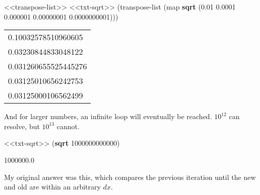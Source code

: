 \documentclass[
]{article}
\newenvironment{Shaded}{}{}
\newcommand{\DecValTok}[1]{\textcolor[rgb]{0.25,0.63,0.44}{#1}}
\newcommand{\FloatTok}[1]{\textcolor[rgb]{0.25,0.63,0.44}{#1}}
\newcommand{\KeywordTok}[1]{\textcolor[rgb]{0.00,0.44,0.13}{\textbf{#1}}}
\newcommand{\NormalTok}[1]{#1}
\begin{document}
\hypertarget{EX1-7-t1}{%
\label{EX1-7-t1}}%
\begin{Shaded}
\begin{Highlighting}[]
\NormalTok{\textless{}\textless{}transpose{-}list\textgreater{}\textgreater{}}
\NormalTok{\textless{}\textless{}txt{-}sqrt\textgreater{}\textgreater{}}
\NormalTok{(transpose{-}list (map }\KeywordTok{sqrt}\NormalTok{ \textquotesingle{}(}\FloatTok{0.01} \FloatTok{0.0001} \FloatTok{0.000001} \FloatTok{0.00000001} \FloatTok{0.0000000001}\NormalTok{)))}
\end{Highlighting}
\end{Shaded}

\begin{longtable}[]{@{}l@{}}
\toprule
\endhead
0.10032578510960605 \\
0.03230844833048122 \\
0.031260655525445276 \\
0.03125010656242753 \\
0.03125000106562499 \\
\bottomrule
\end{longtable}

And for larger numbers, an infinite loop will eventually be reached.
\(10^{12}\) can resolve, but \(10^{13}\) cannot.

\begin{Shaded}
\begin{Highlighting}[]
\NormalTok{\textless{}\textless{}txt{-}sqrt\textgreater{}\textgreater{}}
\NormalTok{(}\KeywordTok{sqrt} \DecValTok{1000000000000}\NormalTok{)}
\end{Highlighting}
\end{Shaded}

\begin{Shaded}
\begin{Highlighting}[]
\FloatTok{1000000.0}
\end{Highlighting}
\end{Shaded}

My original answer was this, which compares the previous iteration until
the new and old are within an arbitrary \(dx\).
\end{document}
